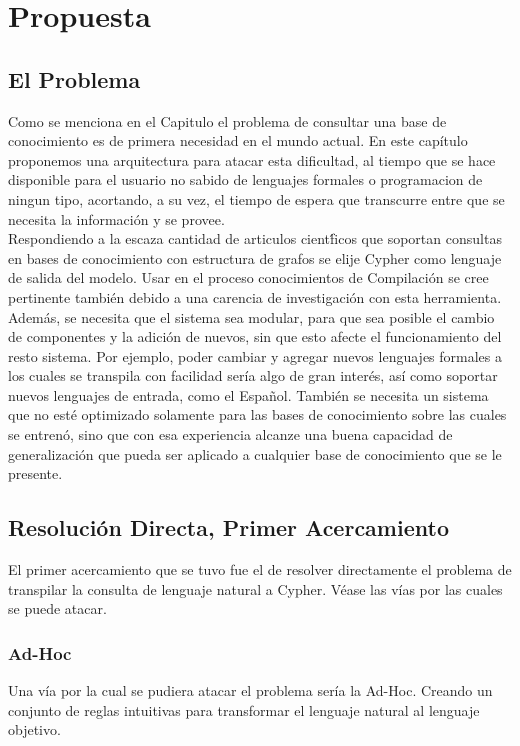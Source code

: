 \chapter{Propuesta}\label{chapter:proposal}

\section{El Problema}
\label{problem}
Como se menciona en el Capitulo  el problema de consultar una base de conocimiento es de primera necesidad en el mundo actual. En este cap\'itulo proponemos una arquitectura para atacar esta dificultad, al tiempo que se hace disponible para el usuario no sabido de lenguajes formales o programacion de ningun tipo, acortando, a su vez, el tiempo de espera que transcurre entre que se necesita la informaci\'on y se provee.\\

Respondiendo a la escaza cantidad de articulos cient\'ficos que soportan consultas en bases de conocimiento con estructura de grafos se elije Cypher como lenguaje de salida del modelo. Usar en el proceso conocimientos de Compilaci\'on se cree pertinente tambi\'en debido a una carencia de investigaci\'on con esta herramienta.\\

Adem\'as, se necesita que el sistema sea modular, para que sea posible el cambio de componentes y la adici\'on de nuevos, sin que esto afecte el funcionamiento del resto sistema. Por ejemplo, poder cambiar y agregar nuevos lenguajes formales a los cuales se transpila con facilidad ser\'ia algo de gran inter\'es, as\'i como soportar nuevos lenguajes de entrada, como el Espa\~nol.
Tambi\'en se necesita un sistema que no est\'e optimizado solamente para las bases de conocimiento sobre las cuales se entren\'o, sino que con esa experiencia alcanze una buena capacidad de generalizaci\'on que pueda ser aplicado a cualquier base de conocimiento que se le presente. 


\section{Resoluci\'on Directa, Primer Acercamiento}
\label{direct}
El primer acercamiento que se tuvo fue el de resolver directamente el problema de transpilar la consulta de lenguaje natural a Cypher. V\'ease las v\'ias por las cuales se puede atacar.

\subsection{Ad-Hoc}
Una v\'ia por la cual se pudiera atacar el problema ser\'ia la Ad-Hoc. Creando un conjunto de reglas intuitivas para transformar el lenguaje natural al lenguaje objetivo.\\

